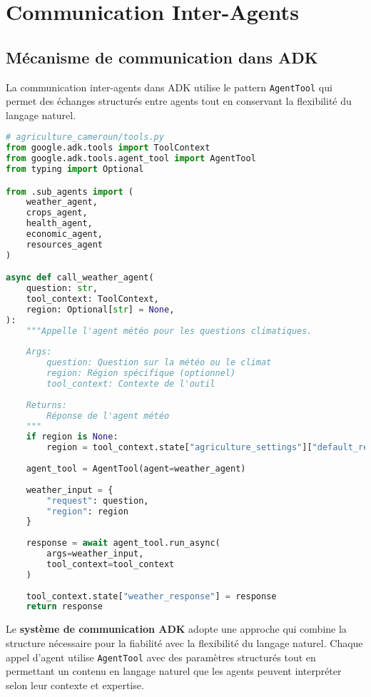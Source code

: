 \section{Communication Inter-Agents}

\subsection{Mécanisme de communication dans ADK}

La communication inter-agents dans ADK utilise le pattern \texttt{AgentTool} qui permet des échanges structurés entre agents tout en conservant la flexibilité du langage naturel.

 
\begin{lstlisting}[language=Python, caption=Communication inter-agents avec AgentTool]
# agriculture_cameroun/tools.py
from google.adk.tools import ToolContext
from google.adk.tools.agent_tool import AgentTool
from typing import Optional

from .sub_agents import (
    weather_agent,
    crops_agent,
    health_agent,
    economic_agent,
    resources_agent
)

async def call_weather_agent(
    question: str,
    tool_context: ToolContext,
    region: Optional[str] = None,
):
    """Appelle l'agent météo pour les questions climatiques.
    
    Args:
        question: Question sur la météo ou le climat
        region: Région spécifique (optionnel)
        tool_context: Contexte de l'outil
    
    Returns:
        Réponse de l'agent météo
    """
    if region is None:
        region = tool_context.state["agriculture_settings"]["default_region"]
    
    agent_tool = AgentTool(agent=weather_agent)
    
    weather_input = {
        "request": question,
        "region": region
    }
    
    response = await agent_tool.run_async(
        args=weather_input,
        tool_context=tool_context
    )
    
    tool_context.state["weather_response"] = response
    return response
\end{lstlisting}

Le \textbf{système de communication ADK} adopte une approche qui combine la structure nécessaire pour la fiabilité avec la flexibilité du langage naturel. Chaque appel d'agent utilise \texttt{AgentTool} avec des paramètres structurés tout en permettant un contenu en langage naturel que les agents peuvent interpréter selon leur contexte et expertise.

